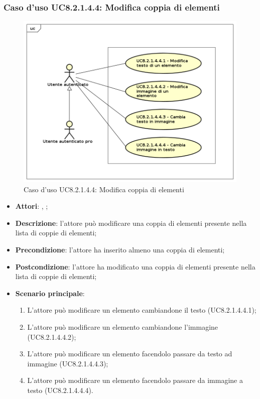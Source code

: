 	\subsubsection{Caso d'uso UC8.2.1.4.4: Modifica coppia di elementi}
	\label{UC8.2.1.4.4}
	\begin{figure}[h]
		\centering
		\includegraphics[scale=0.5,keepaspectratio]{UML/UC8_2_1_4_4.png}
		\caption{Caso d'uso UC8.2.1.4.4: Modifica coppia di elementi}
	\end{figure}
	\FloatBarrier
	\begin{itemize}
		\item \textbf{Attori}: \uau, \uaupro;
		\item \textbf{Descrizione}: l'attore può modificare una coppia di elementi presente nella lista di coppie di elementi;
		\item \textbf{Precondizione}: l'attore ha inserito almeno una coppia di elementi;
		\item \textbf{Postcondizione}: l'attore ha modificato una coppia di elementi presente nella lista di coppie di elementi; 
		\item \textbf{Scenario principale}: 
		\begin{enumerate}
			\item L'attore può modificare un elemento cambiandone il testo (UC8.2.1.4.4.1);
			\item L'attore può modificare un elemento cambiandone l'immagine (UC8.2.1.4.4.2);
			\item L'attore può modificare un elemento facendolo passare da testo ad immagine (UC8.2.1.4.4.3);
			\item L'attore può modificare un elemento facendolo passare da immagine a testo (UC8.2.1.4.4.4).	
		\end{enumerate}
	\end{itemize}
	
